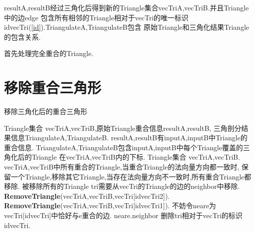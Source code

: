 \documentclass[a4paper]{book}
\renewcommand{\algorithmicrequire}{\textbf{输入:}}
\renewcommand{\algorithmicensure}{\textbf{输出:}}
\renewcommand{\algorithmicrequire}{\textbf{Input : }}
\renewcommand{\algorithmicrequire}{\textbf{Precondition : }}
\renewcommand{\algorithmicensure}{\textbf{Output : }}
\renewcommand{\algorithmicensure}{\textbf{Postcondition : }}
\numberwithin{equation}{chapter}
\theoremstyle{definition}
\begin{document}
resultA,resultB经过三角化后得到新的Triangle集合vecTriA,vecTriB.并且Triangle中的边edge
包含所有相邻的Triangle相对于vecTri的唯一标识idvecTri(\ref{id}).TriangulateA,TriangulateB包含
原始Triangle和三角化结果Triangle的包含关系.

首先处理完全重合的Triangle.


\section{移除重合三角形}
\begin{algorithm}\label{RemoveOverlap}
	\caption{移除三角化后的重合三角形}
	\begin{algorithmic}[1]
		\renewcommand{\algorithmicrequire}{\textbf{Input : }}
		\Require Triangle集合 vecTriA,vecTriB,原始Triangle重合信息resultA,resultB,
        三角剖分结果信息TriangulateA,TriangulateB.
		\renewcommand{\algorithmicrequire}{\textbf{Precondition : }}
		\Require resultA,resultB有inputA,inputB中Triangle的重合信息.
        TriangulateA,TriangulateB包含inputA,inputB中每个Triangle覆盖的三角化后的Triangle
        在vecTriA,vecTriB内的下标.
		\renewcommand{\algorithmicensure}{\textbf{Output : }}
        \Ensure Triangle集合 vecTriA,vecTriB.
		\renewcommand{\algorithmicensure}{\textbf{Postcondition : }}
		\Ensure vecTriA,vecTriB中所有重合的Triangle,当重合Triangle的法向量方向都一致时,
        保留一个Triangle,移除其它Triangle,当存在法向量方向不一致时,所有重合Triangle都移除.
        被移除所有的Triangle tri需要从vecTri的Triangle的边的neighbor中移除.
        \State \textbf{RemoveTriangle}(vecTriA,vecTriB,vecTri[idvecTri2]).
        \EndIf
        \State \textbf{RemoveTriangle}(vecTriA,vecTriB,vecTri[idvecTri1]).
        \EndFor
        \EndFor
        \EndFor
        \EndFor
		\EndFunction
        \State 不妨令neare为vecTri[idvecTri]中恰好与e重合的边.
        \State neare.neighbor 删除tri相对于vecTri的标识idvecTri.
        \EndFor
        \EndFor
        \EndFunction
	\end{algorithmic}
\end{algorithm}
\end{document}
